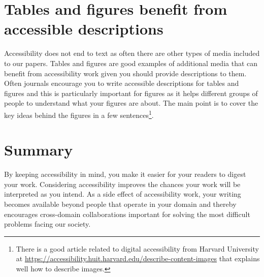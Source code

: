 \section{Tables and figures benefit from accessible descriptions}

Accessibility does not end to text as often there are other types of media included to our papers.
Tables and figures are good examples of additional media that can benefit from accessibility work given you should provide descriptions to them.
Often journals encourage you to write accessible descriptions for tables and figures and this is particularly important for figures as it helps different groups of people to understand what your figures are about.
The main point is to cover the key ideas behind the figures in a few sentences\footnote{There is a good article related to digital accessibility from Harvard University at \url{https://accessibility.huit.harvard.edu/describe-content-images} that explains well how to describe images.}.

\section{Summary}

By keeping accessibility in mind, you make it easier for your readers to digest your work.
Considering accessibility improves the chances your work will be interpreted as you intend.
As a side effect of accessibility work, your writing becomes available beyond people that operate in your domain and thereby encourages cross-domain collaborations important for solving the most difficult problems facing our society.
